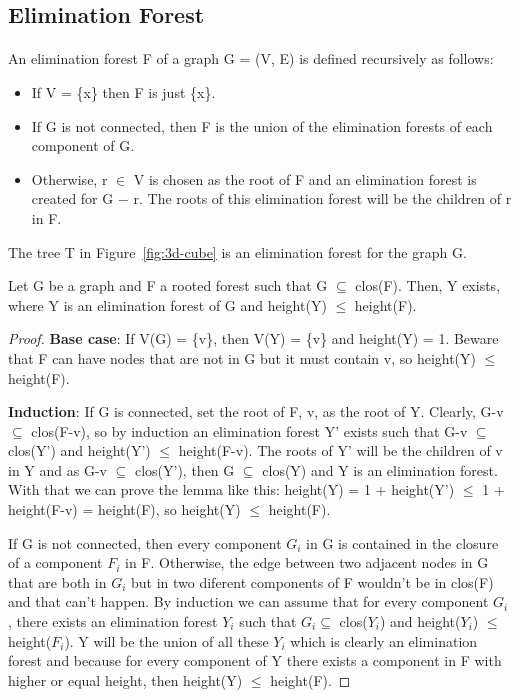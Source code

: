 \subsection{Elimination Forest}
\paragraph{}
An elimination forest F of a graph G = (V, E) is defined recursively as follows:
\begin{itemize}
  \item If V = \{x\} then F is just \{x\}.
  \item If G is not connected, then F is the union of the elimination forests of each component of G.
  \item Otherwise, r $\in$ V is chosen as the root of F and an elimination forest is created for G $-$ r. The roots of this elimination forest will be the children of r in F.
\end{itemize}
The tree T in Figure~\ref{fig:3d-cube} is an elimination forest for the graph G.

\begin{lemma}
\label{lema:min-ET}
Let G be a graph and F a rooted forest such that G $\subseteq$ clos(F). Then, Y exists, where Y is an elimination forest of G and height(Y) $\leq$ height(F).
\end{lemma}

\begin{proof}
  \item \textbf{Base case}: If V(G) = \{v\}, then V(Y) = \{v\} and height(Y) = 1. Beware that F can have nodes that are not in G but it must contain v, so height(Y) $\leq$ height(F).
  \item \textbf{Induction}: If G is connected, set the root of F, v, as the root of Y. Clearly, G-v $\subseteq$ clos(F-v), so by induction an elimination forest Y' exists such that G-v $\subseteq$ clos(Y') and height(Y') $\leq$ height(F-v). The roots of Y' will be the children of v in Y and as G-v $\subseteq$ clos(Y'), then G $\subseteq$ clos(Y) and Y is an elimination forest. With that we can prove the lemma like this: height(Y) = 1 + height(Y') $\leq$ 1 + height(F-v) = height(F), so height(Y) $\leq$ height(F).
  
  If G is not connected, then every component $G_i$ in G is contained in the closure of a component $F_i$ in F. Otherwise, the edge between two adjacent nodes in G that are both in $G_i$ but in two diferent components of F wouldn't be in clos(F) and that can't happen. By induction we can assume that for every component $G_i$, there exists an elimination forest $Y_i$ such that $G_i \subseteq$ clos($Y_i$) and height($Y_i$) $\leq$ height($F_i$). Y will be the union of all these $Y_i$ which is clearly an elimination forest and because for every component of Y there exists a component in F with higher or equal height, then height(Y) $\leq$ height(F).
\end{proof}

